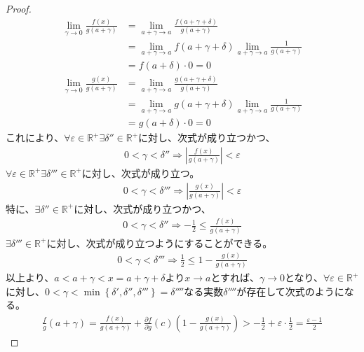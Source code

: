 \documentclass[dvipdfmx]{jsarticle}
\begin{document}
\begin{proof}
\begin{align*}
\lim_{\gamma \rightarrow 0}\frac{f(x)}{g\left( a + \gamma \right)} &= \lim_{a + \gamma \rightarrow a}\frac{f\left( a + \gamma + \delta \right)}{g\left( a + \gamma \right)}\\
&= \lim_{a + \gamma \rightarrow a}{f\left( a + \gamma + \delta \right)}\lim_{a + \gamma \rightarrow a}\frac{1}{g\left( a + \gamma \right)}\\
&= f\left( a + \delta \right) \cdot 0 = 0\\
\lim_{\gamma \rightarrow 0}\frac{g(x)}{g\left( a + \gamma \right)} &= \lim_{a + \gamma \rightarrow a}\frac{g\left( a + \gamma + \delta \right)}{g\left( a + \gamma \right)}\\
&= \lim_{a + \gamma \rightarrow a}{g\left( a + \gamma + \delta \right)}\lim_{a + \gamma \rightarrow a}\frac{1}{g\left( a + \gamma \right)}\\
&= g\left( a + \delta \right) \cdot 0 = 0
\end{align*}
これにより、$\forall\varepsilon \in \mathbb{R}^{+}\exists\delta'' \in \mathbb{R}^{+}$に対し、次式が成り立つかつ、
\begin{align*}
0 < \gamma < \delta'' \Rightarrow \left| \frac{f(x)}{g\left( a + \gamma \right)} \right| < \varepsilon
\end{align*}
$\forall\varepsilon \in \mathbb{R}^{+}\exists\delta''' \in \mathbb{R}^{+}$に対し、次式が成り立つ。
\begin{align*}
0 < \gamma < \delta''' \Rightarrow \left| \frac{g(x)}{g\left( a + \gamma \right)} \right| < \varepsilon
\end{align*}
特に、$\exists\delta'' \in \mathbb{R}^{+}$に対し、次式が成り立つかつ、
\begin{align*}
0 < \gamma < \delta'' \Rightarrow - \frac{1}{2} \leq \frac{f(x)}{g\left( a + \gamma \right)}
\end{align*}
$\exists\delta''' \in \mathbb{R}^{+}$に対し、次式が成り立つようにすることができる。
\begin{align*}
0 < \gamma < \delta''' \Rightarrow \frac{1}{2} \leq 1 - \frac{g(x)}{g\left( a + \gamma \right)}
\end{align*}
以上より、$a < a + \gamma < x = a + \gamma + \delta$より$x \rightarrow a$とすれば、$\gamma \rightarrow 0$となり、$\forall\varepsilon \in \mathbb{R}^{+}$に対し、$0 < \gamma < \min\left\{ \delta',\delta'',\delta''' \right\} = \delta''''$なる実数$\delta''''$が存在して次式のようになる。
\begin{align*}
\frac{f}{g}\left( a + \gamma \right) = \frac{f(x)}{g\left( a + \gamma \right)} + \frac{\partial f}{\partial g}(c)\left( 1 - \frac{g(x)}{g\left( a + \gamma \right)} \right) > - \frac{1}{2} + \varepsilon \cdot \frac{1}{2} = \frac{\varepsilon - 1}{2}

\end{align*}
\end{proof}
\end{document}
